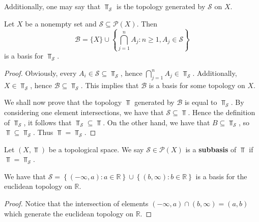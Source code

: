 \documentclass[../../main/main.tex]{subfiles}
\begin{document}
Additionally, one may say that $\Top_{\mathcal{S}}$ is the topology generated by $\mathcal{S}$ on $X$.

\begin{definition}
  Let $X$ be a nonempty set and $\mathcal{S} \subseteq \mathcal{P}(X)$. Then
  \begin{equation*}
    \mathcal{B} = \{ X \} \cup \left\{ \bigcap_{j=1}^{n} A_{j} : n \geq 1, A_{j} \in \mathcal{S} \right\}
  \end{equation*}
  is a basis for $\Top_{\mathcal{S}}$.
\end{definition}
\begin{proof}
  Obviously, every $A_{i} \in \mathcal{S} \subseteq \Top_{\mathcal{S}}$, hence $\bigcap_{j=1}^{n}A_{j} \in \Top_{\mathcal{S}}$. Additionally, $X \in \Top_{\mathcal{S}}$, hence $\mathcal{B} \subseteq \Top_{\mathcal{S}}$. This implies that $\mathcal{B}$ is a basis for some topology on $X$.

  We shall now prove that the topology $\Top$ generated by $\mathcal{B}$ is equal to $\Top_{\mathcal{S}}$. By considering one element intersections, we have that $\mathcal{S} \subseteq\Top$. Hence the definition of $\Top_{\mathcal{S}}$, it follows that $\Top_{\mathcal{S}} \subseteq \Top$. On the other hand, we have that $B \subseteq \Top_{\mathcal{S}}$, so $\Top \subseteq \Top_{\mathcal{S}} $. Thus $\Top = \Top_{\mathcal{S}}$.
\end{proof}

\begin{definition}
  Let $(X, \Top)$ be a topological space. We say $\mathcal{S} \in \mathcal{P}(X)$ is a {\bf subbasis} of $\Top$ if $\Top = \Top_{\mathcal{S}}$.
\end{definition}

\begin{example}
  We have that $\mathcal{S} = \left\{ (-\infty, a) : a \in \mathbb{R} \right\} \cup \left\{ (b, \infty) : b \in \mathbb{R} \right\} $ is a basis for the euclidean topology on $\mathbb{R}$.
\end{example}
\begin{proof}
  Notice that the intersection of elements $(-\infty, a) \cap (b, \infty) = (a, b)$ which generate the euclidean topology on $\mathbb{R}$.
\end{proof}
\end{document}
